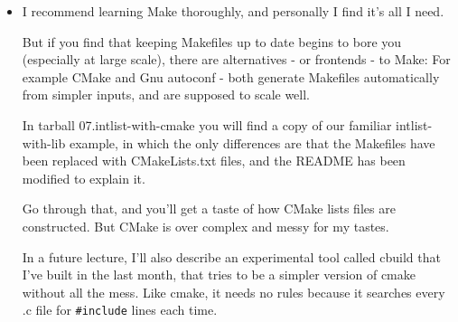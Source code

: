 \documentclass[handout]{beamer}
\begin{document}
\begin{frame}[fragile]

    \begin{itemize}
      \item
        I recommend learning Make thoroughly, and personally I find it's
	all I need.

      \pitem
	But if you find that keeping Makefiles up to date
        begins to bore you (especially at large scale), there are
        alternatives - or frontends - to Make:
      \pitem
	For example \alert{CMake} and Gnu \alert{autoconf} -
	both generate \alert{Makefiles} automatically from simpler
	inputs, and are supposed to scale well.

      \pitem
      In tarball \alert{07.intlist-with-cmake} you will find a copy of our
      familiar intlist-with-lib example, in which the \alert{only}
      differences are that the Makefiles have been replaced with
      CMakeLists.txt files, and the README has been modified to explain it.

      \pitem
      Go through that, and you'll get a taste of how CMake lists files
      are constructed.  But CMake is over complex and messy for my tastes.

      \pitem
      In a future lecture, I'll also describe an experimental tool called
      \alert{cbuild} that I've built in the last month, that tries to be a simpler
      version of cmake without all the mess.  Like cmake, it needs no rules because
      it searches every .c file for \verb+#include+ lines each time.

    \end{itemize}

\end{frame}
\end{document}

